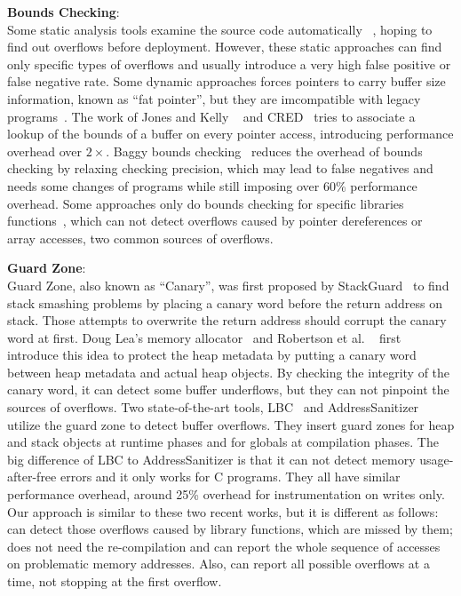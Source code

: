 \textbf{Bounds Checking}: \\ 
Some static analysis tools examine the source code automatically 
~\cite{Wagner00afirst, CSSV}, hoping to find out overflows before deployment. 
However, these static
approaches can find only specific types of overflows and usually introduce a
very high false positive or false negative rate. 
Some dynamic approaches forces pointers to carry buffer size information, known 
as ``fat pointer'', but they are imcompatible with legacy programs~\cite{Austinpldi1994, Cyclone, CCured}.
The work of Jones and Kelly ~\cite{Jones97backwardscompatiblebounds} and 
CRED~\cite{CRED} tries to associate a lookup of the bounds of a buffer
on every pointer access, introducing performance overhead over $2\times$.
Baggy bounds checking~\cite{overflow:Baggy} reduces the overhead of bounds checking by 
relaxing checking precision, 
which may lead to false negatives and needs some changes of programs while still imposing 
over 60\% performance overhead. 
Some approaches only do bounds checking for specific libraries 
functions~\cite{Libsafe, LibsafePlus, HeapShield}, which can not detect overflows caused by 
pointer dereferences or array accesses, two common sources of overflows.   
 
\textbf{Guard Zone}: \\
Guard Zone, also known as ``Canary'', was first proposed by StackGuard~\cite{StackGuard} to find
stack smashing problems by placing a canary word before the return address on stack. Those attempts to
overwrite the return address should corrupt the canary word at first. 
Doug Lea's memory allocator~\cite{dlmalloc} and Robertson et al. ~\cite{Robertson:2003:RDH:1051937.1051947} first introduce this idea to protect the heap metadata by putting a canary
word between heap metadata and actual heap objects. By checking the integrity of 
the canary word, it can detect some buffer underflows, but they can not pinpoint the sources of overflows.
Two state-of-the-art tools, LBC~\cite{overflow:lbc} and AddressSanitizer~\cite{AddressSanitizer} utilize
the guard zone to detect buffer overflows. 
They insert guard zones for heap and stack objects at runtime phases and for globals at 
compilation phases. The big difference of LBC to AddressSanitizer is that it can not 
detect memory usage-after-free errors and it only works for C programs. 
They all have similar performance overhead, around 
25\% overhead for instrumentation on writes only.  
Our approach is similar to these two recent works, but it is different as follows: 
\DoubleTake{} can detect those overflows 
caused by library functions, which are missed by them; \DoubleTake{} does not need the re-compilation 
and can report the whole sequence of accesses on
problematic memory addresses. Also, \DoubleTake{} can report all possible overflows at a time, not 
stopping at the first overflow. 

